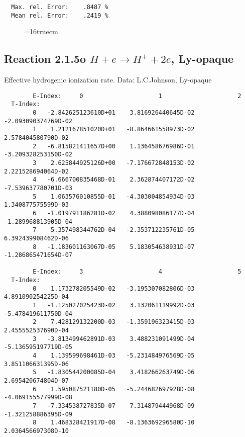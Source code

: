 \documentclass[12pt,dvipdfmx]{article}
\begin{document}
\begin{small}
\begin{verbatim}
  Max. rel. Error:    .8487 %
  Mean rel. Error:    .2419 %
\end{verbatim}\end{small}
\begin{figure} \label{2.1.5}
\epsfxsize=16truecm
\end{figure}
\newpage

\subsection{
Reaction 2.1.5o  $H + e \rightarrow H^+ + 2e $, Ly-opaque}


   Effective hydrogenic ionization rate. Data: L.C.Johnson, Ly-opaque

\begin{small}\begin{verbatim}
        E-Index:     0                     1                     2
  T-Index:
        0   -2.842625123610D+01    3.816926440645D-02   -2.093090374769D-02
        1    1.212167851020D+01   -8.864661558973D-02    2.578404580790D-02
        2   -6.815821411657D+00    1.136458676986D-01   -3.209328253150D-02
        3    2.625844925126D+00   -7.176672848153D-02    2.221528694064D-02
        4   -6.666700835468D-01    2.362874407172D-02   -7.539637780701D-03
        5    1.063576010855D-01   -4.303004854934D-03    1.340877575599D-03
        6   -1.019791186281D-02    4.388098086177D-04   -1.289968813905D-04
        7    5.357498344762D-04   -2.353712235761D-05    6.392439908462D-06
        8   -1.183601163067D-05    5.183054638931D-07   -1.286865471654D-07

        E-Index:     3                     4                     5
  T-Index:
        0    1.173278205549D-02   -3.195307082806D-03    4.891090254225D-04
        1   -1.125027025423D-02    3.132061119992D-03   -5.478419611750D-04
        2    7.428129132200D-03   -1.359196323415D-03    2.455552537690D-04
        3   -3.813499462891D-03    3.488231091499D-04   -5.136595197719D-05
        4    1.139599698461D-03   -5.231484976569D-05    3.851106631395D-06
        5   -1.830544200085D-04    3.418266263749D-06    2.695420674804D-07
        6    1.595087521180D-05   -5.244682697928D-08   -4.069155577999D-08
        7   -7.334538727835D-07    7.314879444968D-09   -1.321258886395D-09
        8    1.468328421917D-08   -8.136369296580D-10    2.036456697308D-10


\end{verbatim}
\end{small}
\end{document}
